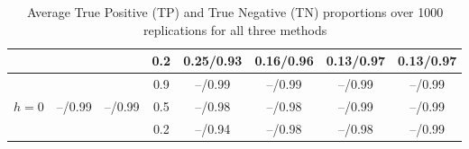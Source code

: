 \begin{table}
\begin{footnotesize}
\begin{tabular}{c|c|c|c|cccc}
    ~    & ~         & ~         & 0.2      & 0.25/0.93 & 0.16/0.96 & 0.13/0.97 & 0.13/0.97 \\\hline
    ~    & ~         & ~         & 0.9      & --/0.99 & --/0.99 & --/0.99 & --/0.99    \\
    $h=0$  & --/0.99 & --/0.99       & 0.5      & --/0.98 & --/0.98 & --/0.99 & --/0.99 \\
    ~    & ~         & ~         & 0.2      & --/0.94 & --/0.98 & --/0.98 & --/0.99 \\\hline
    \end{tabular}
    \caption{Average True Positive (TP) and True Negative (TN) proportions over 1000 replications for all three methods}
    \label{table:SNPSimTable0}
\end{footnotesize}
\end{table}

